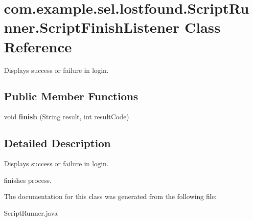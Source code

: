 \hypertarget{interfacecom_1_1example_1_1sel_1_1lostfound_1_1ScriptRunner_1_1ScriptFinishListener}{}\section{com.\+example.\+sel.\+lostfound.\+Script\+Runner.\+Script\+Finish\+Listener Class Reference}
\label{interfacecom_1_1example_1_1sel_1_1lostfound_1_1ScriptRunner_1_1ScriptFinishListener}


Displays success or failure in login.  


\subsection*{Public Member Functions}
\begin{DoxyCompactItemize}
\item 
void {\bfseries finish} (String result, int result\+Code)\hypertarget{interfacecom_1_1example_1_1sel_1_1lostfound_1_1ScriptRunner_1_1ScriptFinishListener_a4e61bdd721e7e7e49d26ffef8d559426}{}\label{interfacecom_1_1example_1_1sel_1_1lostfound_1_1ScriptRunner_1_1ScriptFinishListener_a4e61bdd721e7e7e49d26ffef8d559426}

\end{DoxyCompactItemize}


\subsection{Detailed Description}
Displays success or failure in login. 

finishes process. 

The documentation for this class was generated from the following file\+:\begin{DoxyCompactItemize}
\item 
Script\+Runner.\+java\end{DoxyCompactItemize}
